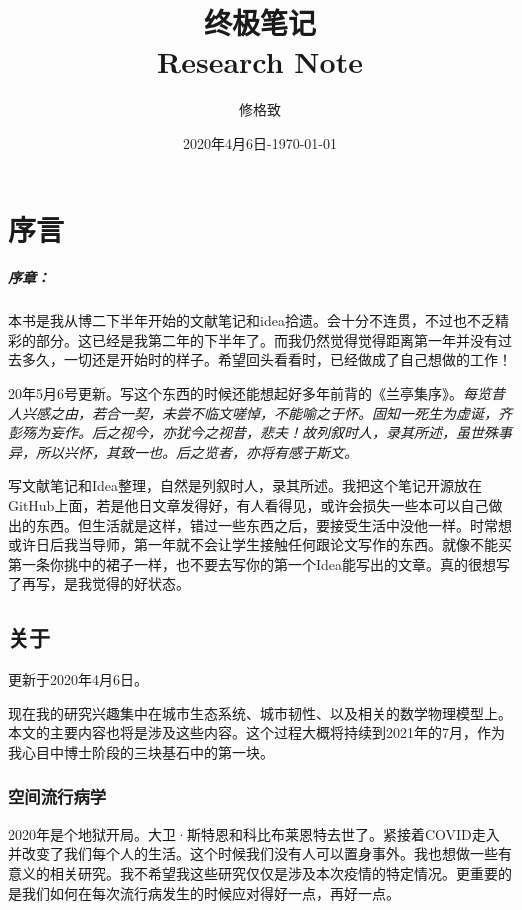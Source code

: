 \documentclass[letterpaper]{book}
\title{终极笔记 \\ Research Note}
\author{修格致}
\date{2020年4月6日-\today}
\begin{document}
\frontmatter

\maketitle

\tableofcontents

\mainmatter

\chapter{序言}

\paragraph{序章：} 本书是我从博二下半年开始的文献笔记和idea拾遗。会十分不连贯，不过也不乏精彩的部分。这已经是我第二年的下半年了。而我仍然觉得觉得距离第一年并没有过去多久，一切还是开始时的样子。希望回头看看时，已经做成了自己想做的工作！

20年5月6号更新。写这个东西的时候还能想起好多年前背的《兰亭集序》。\textit{每览昔人兴感之由，若合一契，未尝不临文嗟悼，不能喻之于怀。固知一死生为虚诞，齐彭殇为妄作。后之视今，亦犹今之视昔，悲夫！故列叙时人，录其所述，虽世殊事异，所以兴怀，其致一也。后之览者，亦将有感于斯文。}

写文献笔记和Idea整理，自然是列叙时人，录其所述。我把这个笔记开源放在GitHub上面，若是他日文章发得好，有人看得见，或许会损失一些本可以自己做出的东西。但生活就是这样，错过一些东西之后，要接受生活中没他一样。时常想或许日后我当导师，第一年就不会让学生接触任何跟论文写作的东西。就像不能买第一条你挑中的裙子一样，也不要去写你的第一个Idea能写出的文章。真的很想写了再写，是我觉得的好状态。


\section{关于}
\textcolor[rgb]{0,0,1}{更新于2020年4月6日。}

现在我的研究兴趣集中在城市生态系统、城市韧性、以及相关的数学物理模型上。本文的主要内容也将是涉及这些内容。这个过程大概将持续到2021年的7月，作为我心目中博士阶段的三块基石中的第一块。

\subsection{空间流行病学}
2020年是个地狱开局。大卫·斯特恩和科比布莱恩特去世了。紧接着COVID走入并改变了我们每个人的生活。这个时候我们没有人可以置身事外。我也想做一些有意义的相关研究。我不希望我这些研究仅仅是涉及本次疫情的特定情况。更重要的是我们如何在每次流行病发生的时候应对得好一点，再好一点。
\end{document}
